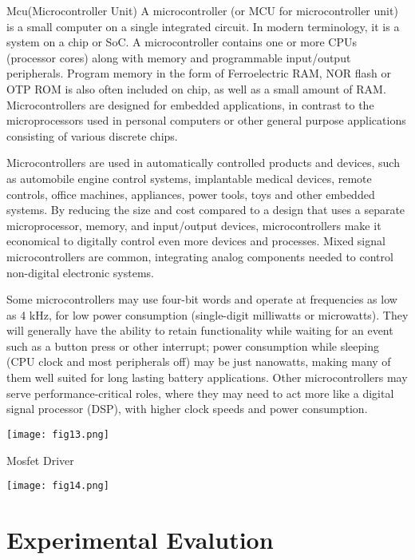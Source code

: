 \documentclass[11pt]{article}
\begin{document}
Mcu(Microcontroller Unit)\newline
A microcontroller (or MCU for microcontroller unit) is a small computer on a single integrated circuit. In modern terminology, it is a system on a chip or SoC. A microcontroller contains one or more CPUs (processor cores) along with memory and programmable input/output peripherals. Program memory in the form of Ferroelectric RAM, NOR flash or OTP ROM is also often included on chip, as well as a small amount of RAM. Microcontrollers are designed for embedded applications, in contrast to the microprocessors used in personal computers or other general purpose applications consisting of various discrete chips.

Microcontrollers are used in automatically controlled products and devices, such as automobile engine control systems, implantable medical devices, remote controls, office machines, appliances, power tools, toys and other embedded systems. By reducing the size and cost compared to a design that uses a separate microprocessor, memory, and input/output devices, microcontrollers make it economical to digitally control even more devices and processes. Mixed signal microcontrollers are common, integrating analog components needed to control non-digital electronic systems.

Some microcontrollers may use four-bit words and operate at frequencies as low as 4 kHz, for low power consumption (single-digit milliwatts or microwatts). They will generally have the ability to retain functionality while waiting for an event such as a button press or other interrupt; power consumption while sleeping (CPU clock and most peripherals off) may be just nanowatts, making many of them well suited for long lasting battery applications. Other microcontrollers may serve performance-critical roles, where they may need to act more like a digital signal processor (DSP), with higher clock speeds and power consumption.

\begin {center}
\texttt{[image: fig13.png]}\newline
\end{center}

Mosfet Driver
\begin {center}
\texttt{[image: fig14.png]}\newline
\end{center}

\section{Experimental Evalution}
\label{Experimental Evalution}
\end{document}
